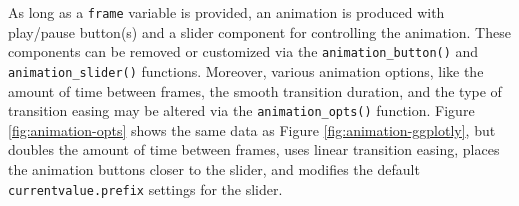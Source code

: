 \documentclass[12pt,]{isuthesis}
\newenvironment{Shaded}{\begin{snugshade}}{\end{snugshade}}
\newcommand{\KeywordTok}[1]{\textcolor[rgb]{0.13,0.29,0.53}{\textbf{{#1}}}}
\newcommand{\DataTypeTok}[1]{\textcolor[rgb]{0.13,0.29,0.53}{{#1}}}
\newcommand{\DecValTok}[1]{\textcolor[rgb]{0.00,0.00,0.81}{{#1}}}
\newcommand{\StringTok}[1]{\textcolor[rgb]{0.31,0.60,0.02}{{#1}}}
\newcommand{\NormalTok}[1]{{#1}}
\begin{document}
As long as a \texttt{frame} variable is provided, an animation is
produced with play/pause button(s) and a slider component for
controlling the animation. These components can be removed or customized
via the \texttt{animation\_button()} and \texttt{animation\_slider()}
functions. Moreover, various animation options, like the amount of time
between frames, the smooth transition duration, and the type of
transition easing may be altered via the \texttt{animation\_opts()}
function. Figure \ref{fig:animation-opts} shows the same data as Figure
\ref{fig:animation-ggplotly}, but doubles the amount of time between
frames, uses linear transition easing, places the animation buttons
closer to the slider, and modifies the default
\texttt{currentvalue.prefix} settings for the slider.

\begin{Shaded}
\end{Shaded}
\end{document}
